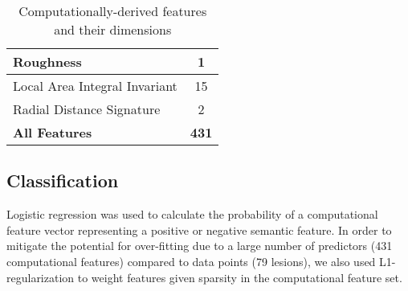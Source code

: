 \begin{table}
\begin{tabular}{|l|c|}
		\hspace{2pt} Roughness & 1\\ \hline
		\hspace{2pt} Local Area Integral Invariant & 15\\ \hline
		\hspace{2pt} Radial Distance Signature & 2\\ \hline \hline
		\textbf{All Features} & \textbf{431} \\ \hline
	\end{tabular}
	\caption{Computationally-derived features and their dimensions}
	\label{table:compfeaturelist}
\end{table}

\subsection{Classification}
Logistic regression was used to calculate the probability of a computational feature vector representing a positive or negative semantic feature. In order to mitigate the potential for over-fitting due to a large number of predictors (431 computational features) compared to data points (79 lesions), we also used L1-regularization \cite{Tibshirani:1996wb} to weight features given sparsity in the computational feature set.
